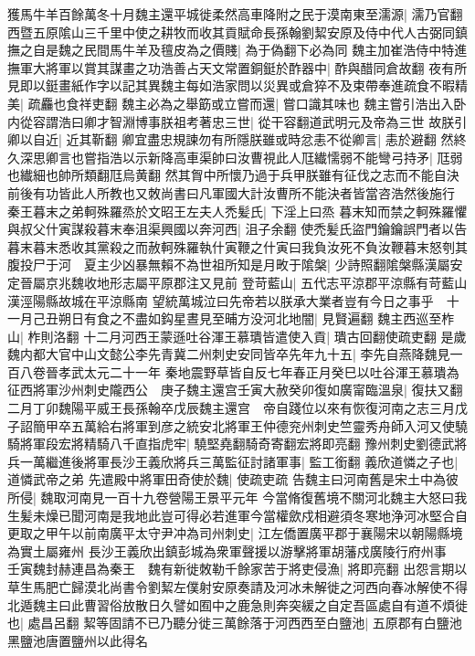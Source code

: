 獲馬牛羊百餘萬冬十月魏主還平城徙柔然高車降附之民于漠南東至濡源|{
	濡乃官翻}
西暨五原隂山三千里中使之耕牧而收其貢賦命長孫翰劉絜安原及侍中代人古弼同鎮撫之自是魏之民間馬牛羊及氊皮為之價賤|{
	為于偽翻下必為同}
魏主加崔浩侍中特進撫軍大將軍以賞其謀畫之功浩善占天文常置銅鋌於酢器中|{
	酢與醋同倉故翻}
夜有所見即以鋌畫紙作字以記其異魏主每如浩家問以災異或倉猝不及束帶奉進疏食不暇精美|{
	疏麤也食祥吏翻}
魏主必為之舉筯或立嘗而還|{
	嘗口識其味也}
魏主嘗引浩出入卧内從容謂浩曰卿才智淵博事朕祖考著忠三世|{
	從干容翻道武明元及帝為三世}
故朕引卿以自近|{
	近其靳翻}
卿宜盡忠規諫勿有所隱朕雖或時忿恚不從卿言|{
	恚於避翻}
然終久深思卿言也嘗指浩以示新降高車渠帥曰汝曹視此人尫纎懦弱不能彎弓持矛|{
	尫弱也纎細也帥所類翻尫烏黄翻}
然其胷中所懷乃過于兵甲朕雖有征伐之志而不能自決前後有功皆此人所教也又敇尚書曰凡軍國大計汝曹所不能決者皆當咨浩然後施行　秦王暮末之弟軻殊羅烝於文昭王左夫人禿髪氏|{
	下淫上曰烝}
暮末知而禁之軻殊羅懼與叔父什寅謀殺暮末奉沮渠興國以奔河西|{
	沮子余翻}
使禿髪氏盜門鑰鑰誤門者以告暮末暮末悉收其黨殺之而赦軻殊羅執什寅鞭之什寅曰我負汝死不負汝鞭暮末怒刳其腹投尸于河　夏主少凶暴無賴不為世祖所知是月畋于隂槃|{
	少詩照翻隂槃縣漢屬安定晉屬京兆魏收地形志屬平原郡注又見前}
登苛藍山|{
	五代志平涼郡平涼縣有苛藍山漢涇陽縣故城在平涼縣南}
望統萬城泣曰先帝若以朕承大業者豈有今日之事乎　十一月己丑朔日有食之不盡如鈎星晝見至晡方没河北地闇|{
	見賢遍翻}
魏主西巡至柞山|{
	柞則洛翻}
十二月河西王蒙遜吐谷渾王慕璝皆遣使入貢|{
	璝古回翻使疏吏翻}
是歲魏内都大官中山文懿公李先青冀二州刺史安同皆卒先年九十五|{
	李先自燕降魏見一百八卷晉孝武太元二十一年}
秦地震野草皆自反七年春正月癸巳以吐谷渾王慕璝為征西將軍沙州刺史隴西公　庚子魏主還宫壬寅大赦癸卯復如廣甯臨溫泉|{
	復扶又翻}
二月丁卯魏陽平威王長孫翰卒戊辰魏主還宫　帝自踐位以來有恢復河南之志三月戊子詔簡甲卒五萬給右將軍到彦之統安北將軍王仲德兖州刺史竺靈秀舟師入河又使驍騎將軍段宏將精騎八千直指虎牢|{
	驍堅堯翻騎奇寄翻宏將即亮翻}
豫州刺史劉德武將兵一萬繼進後將軍長沙王義欣將兵三萬監征討諸軍事|{
	監工銜翻}
義欣道憐之子也|{
	道憐武帝之弟}
先遣殿中將軍田奇使於魏|{
	使疏吏疏}
告魏主曰河南舊是宋土中為彼所侵|{
	魏取河南見一百十九卷營陽王景平元年}
今當脩復舊境不關河北魏主大怒曰我生髪未燥已聞河南是我地此豈可得必若進軍今當權歛戍相避須冬寒地浄河冰堅合自更取之甲午以前南廣平太守尹冲為司州刺史|{
	江左僑置廣平郡于襄陽宋以朝陽縣境為實土屬雍州}
長沙王義欣出鎮彭城為衆軍聲援以游擊將軍胡藩戍廣陵行府州事　壬寅魏封赫連昌為秦王　魏有新徙敇勒千餘家苦于將吏侵漁|{
	將即亮翻}
出怨言期以草生馬肥亡歸漠北尚書令劉絜左僕射安原奏請及河冰未解徙之河西向春冰解使不得北遁魏主曰此曹習俗放散日久譬如囿中之鹿急則奔突緩之自定吾區處自有道不煩徙也|{
	處昌呂翻}
絜等固請不已乃聽分徙三萬餘落于河西西至白鹽池|{
	五原郡有白鹽池黑鹽池唐置鹽州以此得名}
